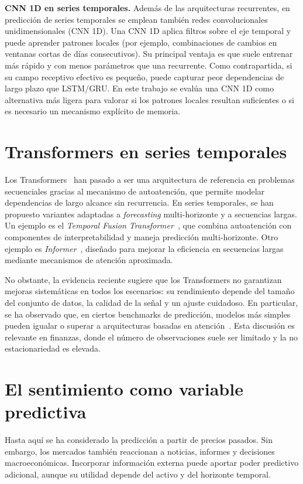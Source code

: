 \textbf{CNN 1D en series temporales.} Además de las arquitecturas recurrentes, en predicción de series temporales se emplean también redes convolucionales unidimensionales (CNN 1D). Una CNN 1D aplica filtros sobre el eje temporal y puede aprender patrones locales (por ejemplo, combinaciones de cambios en ventanas cortas de días consecutivos). Su principal ventaja es que suele entrenar más rápido y con menos parámetros que una recurrente. Como contrapartida, si su campo receptivo efectivo es pequeño, puede capturar peor dependencias de largo plazo que LSTM/GRU. En este trabajo se evalúa una CNN 1D como alternativa más ligera para valorar si los patrones locales resultan suficientes o si es necesario un mecanismo explícito de memoria.

\section{Transformers en series temporales}

Los Transformers~\cite{vaswani2017attention} han pasado a ser una arquitectura de referencia en problemas secuenciales gracias al mecanismo de autoatención, que permite modelar dependencias de largo alcance sin recurrencia. En series temporales, se han propuesto variantes adaptadas a \textit{forecasting} multi-horizonte y a secuencias largas. Un ejemplo es el \emph{Temporal Fusion Transformer}~\cite{lim2021tft}, que combina autoatención con componentes de interpretabilidad y maneja predicción multi-horizonte. Otro ejemplo es \emph{Informer}~\cite{zhou2021informer}, diseñado para mejorar la eficiencia en secuencias largas mediante mecanismos de atención aproximada.

No obstante, la evidencia reciente sugiere que los Transformers no garantizan mejoras sistemáticas en todos los escenarios: su rendimiento depende del tamaño del conjunto de datos, la calidad de la señal y un ajuste cuidadoso. En particular, se ha observado que, en ciertos benchmarks de predicción, modelos más simples pueden igualar o superar a arquitecturas basadas en atención~\cite{zeng2023transformers}. Esta discusión es relevante en finanzas, donde el número de observaciones suele ser limitado y la no estacionariedad es elevada.

\section{El sentimiento como variable predictiva}

Hasta aquí se ha considerado la predicción a partir de precios pasados. Sin embargo, los mercados también reaccionan a noticias, informes y decisiones macroeconómicas. Incorporar información externa puede aportar poder predictivo adicional, aunque su utilidad depende del activo y del horizonte temporal.

